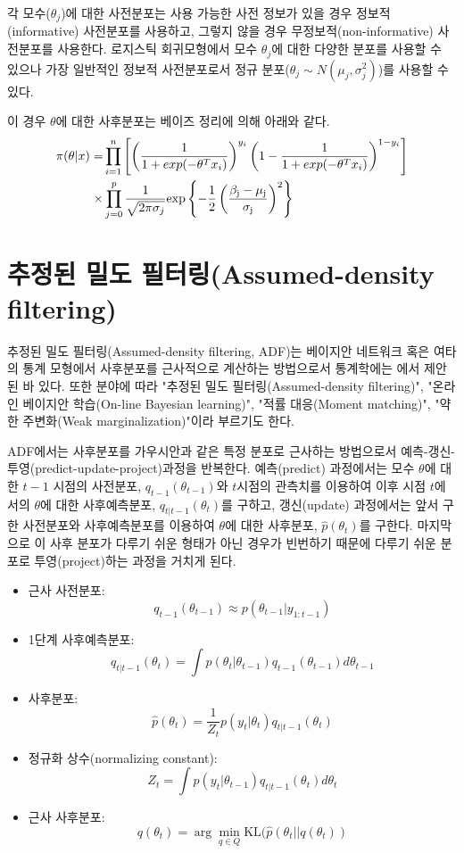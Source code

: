 \documentclass[oneside,b5paper,11pt]{book} %
\begin{document}
 각 모수($\theta_j$)에 대한 사전분포는 사용 가능한 사전 정보가 있을 경우 정보적(informative) 사전분포를 사용하고, 그렇지 않을 경우 무정보적(non-informative) 사전분포를 사용한다. 로지스틱 회귀모형에서 모수 $\theta_j$에 대한 다양한 분포를 사용할 수 있으나 가장 일반적인 정보적 사전분포로서 정규 분포($\theta_j \sim N(\mu_{j} , \sigma_{j}^2)$)를 사용할 수 있다.

 이 경우 $\theta$에 대한 사후분포는 베이즈 정리에 의해 아래와 같다.
\begin{equation}
\begin{split}
\pi(\theta|x) = 
&\prod\limits_{i=1}^{n}
	\left[ 
		\left(
			\frac{1}{1+exp(-\theta^T x_i)} 
		\right) ^{y_i}
		\left(
			1-{\frac{1}{1+exp(-\theta^T x_i)}}
		\right)^{1-y_i}
	\right] \\
\times &\prod\limits_{j=0}^{p} \frac{1}{\sqrt{2\pi\sigma_j}}
	\rm{exp}
	\left\{
		-\frac{1}{2}
		\left(
			\frac{\beta_j - \mu_j}{\sigma_j}
		\right)^2
	\right\}
\end{split}
\end{equation}




\section{추정된 밀도 필터링(Assumed-density filtering)}
 추정된 밀도 필터링(Assumed-density filtering, ADF)는 베이지안 네트워크 혹은 여타의 통계 모형에서 사후분포를 근사적으로 계산하는 방법으로서 통계학에는 \citet{Lauritzen1992}에서 제안된 바 있다. 또한 분야에 따라 "추정된 밀도 필터링(Assumed-density filtering)", "온라인 베이지안 학습(On-line Bayesian learning)", "적률 대응(Moment matching)", "약한 주변화(Weak marginalization)"이라 부르기도 한다. \citep{Minka2013}

 ADF에서는 사후분포를 가우시안과 같은 특정 분포로 근사하는 방법으로서 예측-갱신-투영(predict-update-project)과정을 반복한다. 예측(predict) 과정에서는 모수 $\theta$에 대한 $t-1$ 시점의 사전분포, $q_{t-1}(\theta_{t-1})$와 $t$시점의 관측치를 이용하여 이후 시점 $t$에서의 $\theta$에 대한 사후예측분포, $q_{t|t-1}(\theta_{t})$를 구하고, 갱신(update) 과정에서는 앞서 구한 사전분포와 사후예측분포를 이용하여 $\theta$에 대한 사후분포, $\hat{p}(\theta_t)$를 구한다. 마지막으로 이 사후 분포가 다루기 쉬운 형태가 아닌 경우가 빈번하기 때문에 다루기 쉬운 분포로 투영(project)하는 과정을 거치게 된다.

\begin{itemize}
\item 근사 사전분포: 
$$q_{t-1}(\theta_{t-1}) \approx p(\theta_{t-1}|y_{1:t-1})$$
\item 1단계 사후예측분포: 
$$q_{t|t-1}(\theta_t) = \int p(\theta_t | \theta_{t-1}) q_{t-1}(\theta_{t-1}) d\theta_{t-1}$$
\item 사후분포:
$$\hat{p}(\theta_t) = \frac{1}{Z_t}p(y_t | \theta_t)q_{t|t-1}(\theta_t)$$
\item 정규화 상수(normalizing constant):
$$Z_t = \int p(y_t | \theta_{t-1})q_{t|t-1}(\theta_{t})d\theta_{t}$$
\item 근사 사후분포:
$$q(\theta_t) = \arg\min_{q \in Q} \mathrm{KL}(\hat{p}(\theta_t || q(\theta_t)) $$
\end{itemize}
\end{document}

